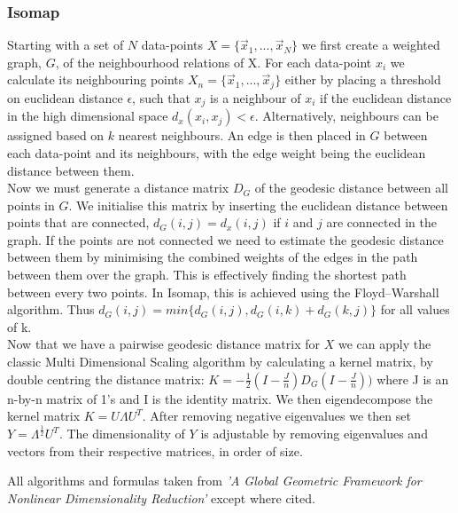 \documentclass{article}
\begin{document}
\subsubsection{Isomap}
Starting with a set of $N$ data-points $X = \{\vec{x}_1,...,\vec{x}_N\}$ we first create a weighted graph, $G$, of the neighbourhood relations of X. For each data-point $x_i$ we calculate its neighbouring points $X_n = \{\vec{x}_1,...,\vec{x}_j\}$ either by placing a threshold on euclidean distance $\epsilon$, such that $x_j$ is a neighbour of $x_i$ if the euclidean distance in the high dimensional space $d_x(x_i,x_j) < \epsilon$. Alternatively, neighbours can be assigned based on $k$ nearest neighbours. An edge is then placed in $G$ between each data-point and its neighbours, with the edge weight being the euclidean distance between them. \\
Now we must generate a distance matrix $D_G$ of the geodesic distance between all points in $G$. We initialise this matrix by inserting the euclidean distance between points that are connected, $d_G(i,j) = d_x(i,j)$ if $i$ and $j$ are connected in the graph. If the points are not connected we need to estimate the geodesic distance between them by minimising the combined weights of the edges in the path between them over the graph. This is effectively finding the shortest path between every two points. In Isomap, this is achieved using the Floyd–Warshall algorithm.\cite{floyd1962algorithm} Thus $ d_G(i,j) = min\{d_G(i,j),d_G(i,k) + d_G(k,j)\}$ for all values of k. \\
Now that we have a pairwise geodesic distance matrix for $X$ we can apply the classic Multi Dimensional Scaling algorithm by calculating a kernel matrix, by double centring the distance matrix: $K = -\frac{1}{2}(I - \frac{J}{n})D_G(I-\frac{J}{n}))$ where J is an n-by-n matrix of 1's and I is the identity matrix. We then eigendecompose the kernel matrix $K = U\Lambda U^T$. After removing negative eigenvalues we then set $Y = \Lambda^{\frac{1}{2}}U^T$. The dimensionality of $Y$ is adjustable by removing eigenvalues and vectors from their respective matrices, in order of size.

All algorithms and formulas taken from \textit{'A Global Geometric Framework for Nonlinear Dimensionality Reduction'}\cite{tenenbaum2000global} except where cited.
\end{document}
